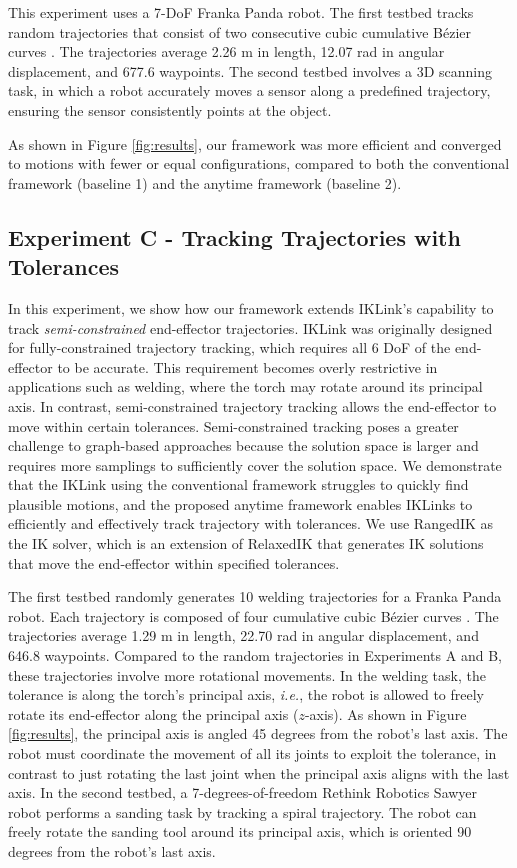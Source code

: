 This experiment uses a 7-DoF Franka Panda robot. The first testbed tracks random trajectories that consist of two consecutive cubic cumulative Bézier curves \cite{kim1995general}. The trajectories average 2.26 m in length, 12.07 rad in angular displacement, and 677.6 waypoints.
The second testbed involves a 3D scanning task, in which a robot accurately moves a sensor along a predefined trajectory, ensuring the sensor consistently points at the object.

As shown in Figure \ref{fig:results}, our framework was more efficient and converged to motions with fewer or equal configurations, compared to both the conventional framework (baseline 1) and the \naive anytime framework (baseline 2).


\vspace{-3mm}
\subsection{Experiment C - Tracking Trajectories with Tolerances} \label{sec: expC}
In this experiment, we show how our framework extends IKLink's capability \cite{wang2024iklink} to track \textit{semi-constrained} end-effector trajectories. 
IKLink was originally designed for fully-constrained trajectory tracking, which requires all 6 DoF of the end-effector to be accurate. This requirement becomes overly restrictive in applications such as welding, where the torch may rotate around its principal axis. In contrast, semi-constrained trajectory tracking allows the end-effector to move within certain tolerances. 
Semi-constrained tracking poses a greater challenge to graph-based approaches because the solution space is larger and requires more samplings to sufficiently cover the solution space. 
We demonstrate that the IKLink using the conventional framework struggles to quickly find plausible motions, and the proposed anytime framework enables IKLinks to efficiently and effectively track trajectory with tolerances. We use RangedIK \cite{wang2023rangedik} as the IK solver, which is an extension of RelaxedIK that generates IK solutions that move the end-effector within specified tolerances. 

The first testbed randomly generates 10 welding trajectories for a Franka Panda robot. Each trajectory is composed of four cumulative cubic Bézier curves \cite{kim1995general}. The trajectories average 1.29 m in length, 22.70 rad in angular displacement, and 646.8 waypoints. Compared to the random trajectories in Experiments A and B, these trajectories involve more rotational movements. In the welding task, the tolerance is along the torch's principal axis, \textit{i.e.}, the robot is allowed to freely rotate its end-effector along the principal axis ($z$-axis). As shown in Figure \ref{fig:results}, the principal axis is angled 45 degrees from the robot's last axis. The robot must coordinate the movement of all its joints to exploit the tolerance, in contrast to just rotating the last joint when the principal axis aligns with the last axis. In the second testbed, a 7-degrees-of-freedom Rethink Robotics Sawyer robot performs a sanding task by tracking a spiral trajectory. The robot can freely rotate the sanding tool around its principal axis, which is oriented 90 degrees from the robot's last axis. 

